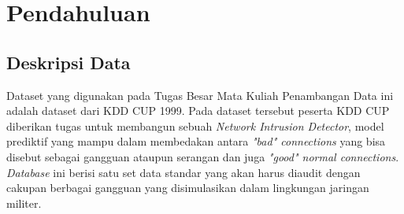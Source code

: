 \chapter{Pendahuluan}

\section{Deskripsi Data}

Dataset yang digunakan pada Tugas Besar Mata Kuliah Penambangan Data ini adalah dataset dari KDD CUP 1999. Pada dataset tersebut peserta KDD CUP diberikan tugas untuk membangun sebuah \emph{Network Intrusion Detector}, model prediktif yang mampu dalam membedakan antara {\emph{"bad" connections}} yang bisa disebut sebagai gangguan ataupun serangan dan juga {\emph{"good" normal connections}}. \emph{Database} ini berisi satu set  data standar yang akan harus diaudit dengan cakupan berbagai gangguan yang disimulasikan dalam lingkungan jaringan militer.
